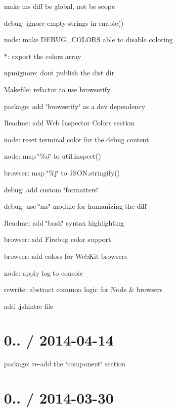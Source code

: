 \begin{DoxyItemize}
\item make ms diff be global, not be scope
\item debug\+: ignore empty strings in enable()
\item node\+: make D\+E\+B\+U\+G\+\_\+\+C\+O\+L\+O\+R\+S able to disable coloring
\item $\ast$\+: export the {\ttfamily colors} array
\item npmignore\+: don\textquotesingle{}t publish the {\ttfamily dist} dir
\item Makefile\+: refactor to use browserify
\item package\+: add \char`\"{}browserify\char`\"{} as a dev dependency
\item Readme\+: add Web Inspector Colors section
\item node\+: reset terminal color for the debug content
\item node\+: map \char`\"{}\%o\char`\"{} to {\ttfamily util.\+inspect()}
\item browser\+: map \char`\"{}\%j\char`\"{} to {\ttfamily J\+S\+O\+N.\+stringify()}
\item debug\+: add custom \char`\"{}formatters\char`\"{}
\item debug\+: use \char`\"{}ms\char`\"{} module for humanizing the diff
\item Readme\+: add \char`\"{}bash\char`\"{} syntax highlighting
\item browser\+: add Firebug color support
\item browser\+: add colors for Web\+Kit browsers
\item node\+: apply log to {\ttfamily console}
\item rewrite\+: abstract common logic for Node \& browsers
\item add .jshintrc file
\end{DoxyItemize}

\section*{0.. / 2014-\/04-\/14 }


\begin{DoxyItemize}
\item package\+: re-\/add the \char`\"{}component\char`\"{} section
\end{DoxyItemize}

\section*{0.. / 2014-\/03-\/30 }


